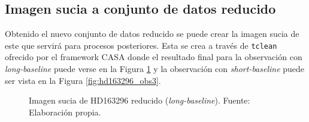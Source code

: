 \subsection{Imagen sucia a conjunto de datos reducido}
\label{subsec:dirty_image}

Obtenido el nuevo conjunto de datos reducido se puede crear la imagen sucia de este que servirá para procesos posteriores. Esta se crea a través de \texttt{tclean} ofrecido por el framework CASA donde el resultado final para la observación con \textit{long-baseline} puede verse en la Figura \ref{fig:hd163296_obs8} y la observación con \textit{short-baseline} puede ser vista en la Figura \ref{fig:hd163296_obs3}. 

\begin{figure}[!ht]
 \centering
 \caption[Imagen sucia de HD163296 reducido (\textit{long-baseline})]{Imagen sucia de HD163296 reducido (\textit{long-baseline}). Fuente: Elaboración propia.}
 \label{fig:hd163296_obs8}
\end{figure}


